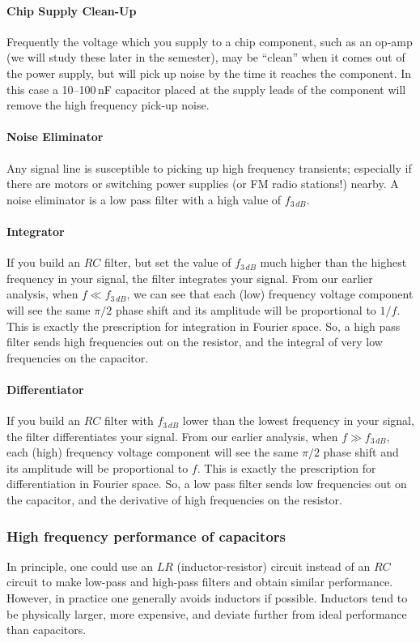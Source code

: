 \documentclass{article}
\begin{document}
\paragraph{Chip Supply Clean-Up}
Frequently the voltage which you supply to a chip component, such as an op-amp (we will study these later in the semester), may be ``clean'' when it comes out of the power supply, but will pick up noise by the time it reaches the component. In this case a 10--100\,nF capacitor placed at the supply leads of the component will remove the high frequency pick-up noise.

\paragraph{Noise Eliminator}
Any signal line is susceptible to picking up high frequency transients; especially if there are motors or switching power supplies (or FM radio stations!) nearby. A noise eliminator is a low pass filter with a high value of $f_{3\,dB}$. 

\paragraph{Integrator}
If you build an $RC$ filter, but set the value of $f_{3\,dB}$ much higher than the highest frequency in your signal, the filter integrates your signal. From our earlier analysis, when $f \ll f_{3\,dB}$, we can see that each (low) frequency voltage component will see the same $\pi/2$ phase shift and its amplitude will be proportional to $1/f$. This is exactly the prescription for integration in Fourier space. So, a high pass filter sends high frequencies out on the resistor, and the integral of very low frequencies on the capacitor. 

\paragraph{Differentiator}
If you build an $RC$ filter with $f_{3\,dB}$ lower than the lowest frequency in your signal, the filter differentiates your signal. From our earlier analysis, when $f \gg f_{3\,dB}$, each (high) frequency voltage component will see the same $\pi/2$ phase shift and its amplitude will be proportional to $f$. This is exactly the prescription for differentiation in Fourier space. So, a low pass filter sends low frequencies out on the capacitor, and the derivative of high frequencies on the resistor.

\subsubsection{High frequency performance of capacitors}
In principle, one could use an $LR$ (inductor-resistor) circuit instead of an $RC$ circuit to make low-pass and high-pass filters and obtain similar performance. However, in practice one generally avoids inductors if possible. Inductors tend to be physically larger, more expensive, and deviate further from ideal performance than capacitors.
\end{document}
